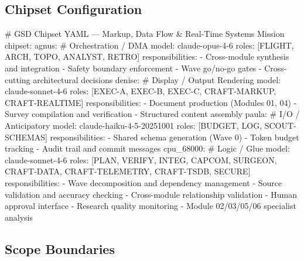 \documentclass[11pt,letterpaper]{article}
\begin{document}
\subsection{Chipset Configuration}

\begin{asciibox}
\# GSD Chipset YAML --- Markup, Data Flow \& Real-Time Systems Mission
chipset:
  agnus:                      \# Orchestration / DMA
    model: claude-opus-4-6
    roles: [FLIGHT, ARCH, TOPO, ANALYST, RETRO]
    responsibilities:
      - Cross-module synthesis and integration
      - Safety boundary enforcement
      - Wave go/no-go gates
      - Cross-cutting architectural decisions
  denise:                     \# Display / Output Rendering
    model: claude-sonnet-4-6
    roles: [EXEC-A, EXEC-B, EXEC-C, CRAFT-MARKUP, CRAFT-REALTIME]
    responsibilities:
      - Document production (Modules 01, 04)
      - Survey compilation and verification
      - Structured content assembly
  paula:                      \# I/O / Anticipatory
    model: claude-haiku-4-5-20251001
    roles: [BUDGET, LOG, SCOUT-SCHEMAS]
    responsibilities:
      - Shared schema generation (Wave 0)
      - Token budget tracking
      - Audit trail and commit messages
  cpu\_68000:                  \# Logic / Glue
    model: claude-sonnet-4-6
    roles: [PLAN, VERIFY, INTEG, CAPCOM, SURGEON,
            CRAFT-DATA, CRAFT-TELEMETRY, CRAFT-TSDB, SECURE]
    responsibilities:
      - Wave decomposition and dependency management
      - Source validation and accuracy checking
      - Cross-module relationship validation
      - Human approval interface
      - Research quality monitoring
      - Module 02/03/05/06 specialist analysis
\end{asciibox}

\subsection{Scope Boundaries}
\end{document}
